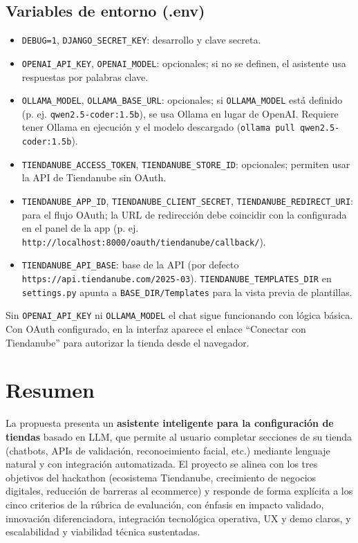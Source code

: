 \documentclass[9pt,a4paper,twocolumn,twoside]{rho-class/rho}
\begin{document}
\subsection{Variables de entorno (.env)}

\begin{itemize}
    \item \texttt{DEBUG=1}, \texttt{DJANGO\_SECRET\_KEY}: desarrollo y clave secreta.
    \item \texttt{OPENAI\_API\_KEY}, \texttt{OPENAI\_MODEL}: opcionales; si no se definen, el asistente usa respuestas por palabras clave.
    \item \texttt{OLLAMA\_MODEL}, \texttt{OLLAMA\_BASE\_URL}: opcionales; si \texttt{OLLAMA\_MODEL} está definido (p. ej. \texttt{qwen2.5-coder:1.5b}), se usa Ollama en lugar de OpenAI. Requiere tener Ollama en ejecución y el modelo descargado (\texttt{ollama pull qwen2.5-coder:1.5b}).
    \item \texttt{TIENDANUBE\_ACCESS\_TOKEN}, \texttt{TIENDANUBE\_STORE\_ID}: opcionales; permiten usar la API de Tiendanube sin OAuth.
    \item \texttt{TIENDANUBE\_APP\_ID}, \texttt{TIENDANUBE\_CLIENT\_SECRET}, \texttt{TIENDANUBE\_REDIRECT\_URI}: para el flujo OAuth; la URL de redirección debe coincidir con la configurada en el panel de la app (p. ej. \texttt{http://localhost:8000/oauth/tiendanube/callback/}).
    \item \texttt{TIENDANUBE\_API\_BASE}: base de la API (por defecto \texttt{https://api.tiendanube.com/2025-03}). \texttt{TIENDANUBE\_TEMPLATES\_DIR} en \texttt{settings.py} apunta a \texttt{BASE\_DIR/Templates} para la vista previa de plantillas.
\end{itemize}

Sin \texttt{OPENAI\_API\_KEY} ni \texttt{OLLAMA\_MODEL} el chat sigue funcionando con lógica básica. Con OAuth configurado, en la interfaz aparece el enlace ``Conectar con Tiendanube'' para autorizar la tienda desde el navegador.

\section{Resumen}

La propuesta presenta un \textbf{asistente inteligente para la configuración de tiendas} basado en LLM, que permite al usuario completar secciones de su tienda (chatbots, APIs de validación, reconocimiento facial, etc.) mediante lenguaje natural y con integración automatizada. El proyecto se alinea con los tres objetivos del hackathon (ecosistema Tiendanube, crecimiento de negocios digitales, reducción de barreras al ecommerce) y responde de forma explícita a los cinco criterios de la rúbrica de evaluación, con énfasis en impacto validado, innovación diferenciadora, integración tecnológica operativa, UX y demo claros, y escalabilidad y viabilidad técnica sustentadas.


\printbibliography

\end{document}
